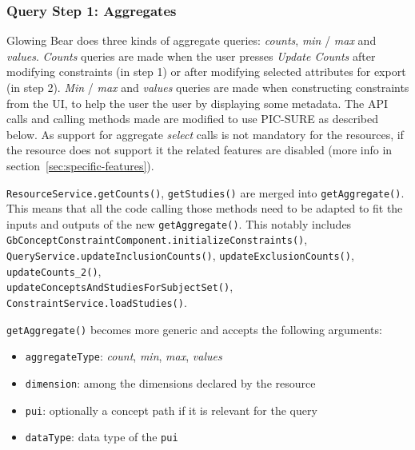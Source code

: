 
\subsubsection{Query Step 1: Aggregates}
\label{sec:gb-step1-aggregates}

Glowing Bear does three kinds of aggregate queries: \emph{counts}, \emph{min} / \emph{max} and \emph{values}. 
\emph{Counts} queries are made when the user presses \emph{Update Counts} after modifying constraints (in step 1) or after modifying selected attributes for export (in step 2).
\emph{Min} / \emph{max} and \emph{values} queries are made when constructing constraints from the UI, to help the user the user by displaying some metadata.
The API calls and calling methods made are modified to use PIC-SURE as described below.
As support for aggregate \emph{select} calls is not mandatory for the resources, if the resource does not support it the related features are disabled (more info in section~\ref{sec:specific-features}).

\verb|ResourceService.getCounts()|, \verb|getStudies()| are merged into \verb|getAggregate()|.
This means that all the code calling those methods need to be adapted to fit the inputs and outputs of the new \verb|getAggregate()|.
This notably includes \verb|GbConceptConstraintComponent.initializeConstraints()|, \verb|QueryService.updateInclusionCounts()|, \verb|updateExclusionCounts()|, \verb|updateCounts_2()|, \\
\verb|updateConceptsAndStudiesForSubjectSet()|, \verb|ConstraintService.loadStudies()|.

\verb|getAggregate()| becomes more generic and accepts the following arguments:
\begin{itemize}
    \item \verb|aggregateType|: \emph{count}, \emph{min}, \emph{max}, \emph{values}
    \item \verb|dimension|: among the dimensions declared by the resource
    \item \verb|pui|: optionally a concept path if it is relevant for the query
    \item \verb|dataType|: data type of the \verb|pui|
\end{itemize}

